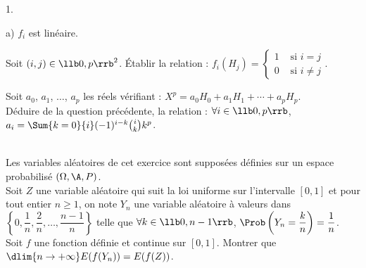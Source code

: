 \documentclass[11pt]{article}%
\begin{document}
\begin{exerciceAP}
\begin{noliste}{1.}
\begin{noliste}{a)}
      $f_i$ est linéaire.
    \item Soit $(i,j)\in\llb 0,p\rrb^2$. Établir la relation :
      $f_i(H_j)=\left\{
        \begin{array}{ll}
          1 & \mbox{ si $i=j$}\\
          0 & \mbox{ si $i\neq j$}
	\end{array}
      \right.$.
    \item Soit $a_0$, $a_1$, $\hdots$, $a_p$ les réels vérifiant :
      $X^p = a_0H_0+a_1H_1+\cdots +a_pH_p$.\\
      Déduire de la question précédente, la relation : $\forall i
      \in\llb 0,p\rrb$, $a_i=\Sum{k=0}{i} (-1)^{i-k}\binom{i}{k}k^p$.
    \end{noliste}
  \end{noliste}
\end{exerciceAP}



\begin{exerciceSP}~\\
  Les variables aléatoires de cet exercice sont supposées définies sur
  un espace probabilisé $(\Omega,\A,P)$.\\
  Soit $Z$ une variable aléatoire qui suit la loi uniforme sur
  l'intervalle $[0,1]$ et pour tout entier $n\geq 1$, on note $Y_n$
  une variable aléatoire à valeurs dans
  $\left\{0,\dfrac{1}{n},\dfrac{2}{n},\hdots, \dfrac{n-1}{n}\right\}$
  telle que $\forall k\in\llb 0,n-1\rrb$,
  $\Prob\left(Y_n=\dfrac{k}{n}\right)=\dfrac{1}{n}$.\\
  Soit $f$ une fonction définie et continue sur $[0,1]$. Montrer que
  $\dlim{n\to+\infty} E(f(Y_n))=E(f(Z))$.
\end{exerciceSP}



\newpage
\end{document}
